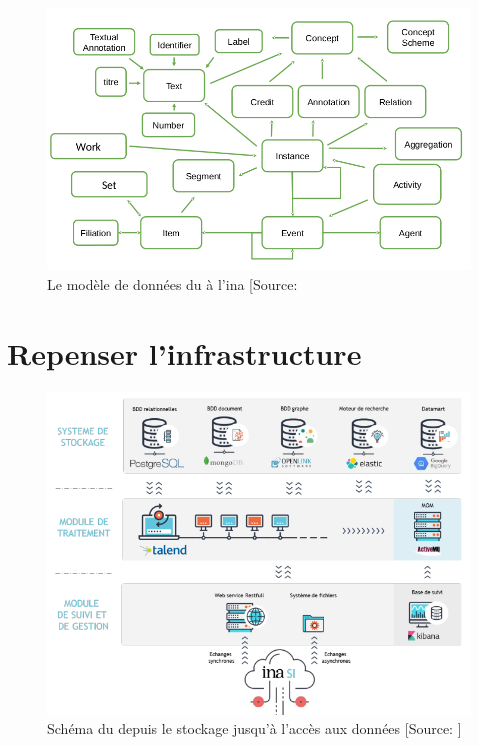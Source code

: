 \begin{figure}[!h]
	\centering
	\includegraphics[width=16cm]{images/schema_global_lac.png}
	\caption[Le modèle de données du \ldd à l'\ac{ina}]{Le modèle de données du \ldd à l'\ac{ina} [Source:\cite[d.13]{roche-diore_atelier_2020}}
	\label{modele_ldd}
\end{figure}

\chapter{\label{annexe_lac}Repenser l'infrastructure}

\begin{figure}[!h]
	\centering
	\includegraphics[width=16cm]{images/infrastructure_unique.png}
	\caption[Schéma du \ldd depuis le stockage jusqu'à l'accès aux données]{Schéma du \ldd depuis le stockage jusqu'à l'accès aux données [Source: \cite{poupeau_rassembler_2019}]}
	\label{lac_infra}
\end{figure}

